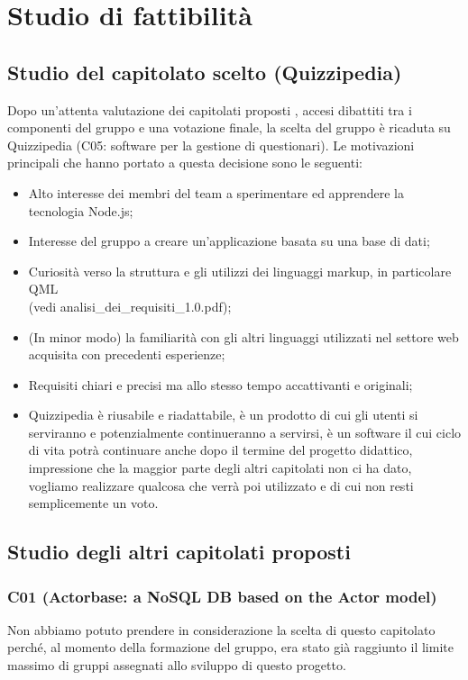 \documentclass[a4paper,11pt]{article}
\begin{document}
\newpage

\section{Studio di fattibilità}


\subsection{Studio del capitolato scelto (Quizzipedia)}

Dopo un'attenta valutazione dei capitolati proposti , accesi dibattiti tra i componenti del gruppo e una votazione finale, la scelta del gruppo è ricaduta su Quizzipedia (C05: software per la gestione di questionari). Le motivazioni principali che hanno portato a questa decisione sono le seguenti:
\begin{itemize}
\item Alto interesse dei membri del team a sperimentare ed apprendere la tecnologia Node.js;
\item Interesse del gruppo a creare un'applicazione basata su una base di dati;
\item Curiosità verso la struttura e gli utilizzi dei linguaggi markup, in particolare QML \\(vedi analisi\_dei\_requisiti\_1.0.pdf);
\item (In minor modo) la familiarità con gli altri linguaggi utilizzati nel settore web acquisita con precedenti esperienze;
\item Requisiti chiari e precisi ma allo stesso tempo accattivanti e originali;
\item Quizzipedia è riusabile e riadattabile, è un prodotto di cui gli utenti si serviranno e potenzialmente continueranno a servirsi, è un software il cui ciclo di vita potrà continuare anche dopo il termine del progetto didattico, impressione che la maggior parte degli altri capitolati non ci ha dato, vogliamo realizzare qualcosa che verrà poi utilizzato e di cui non resti semplicemente un voto.
\end{itemize}

\newpage

\subsection{Studio degli altri capitolati proposti}

\subsubsection{C01 (Actorbase: a NoSQL DB based on the Actor model)}
\label{c1}
Non abbiamo potuto prendere in considerazione la scelta di questo capitolato perché, al momento della formazione del gruppo, era stato già raggiunto il limite massimo di gruppi assegnati allo sviluppo di questo progetto. 
\end{document}
